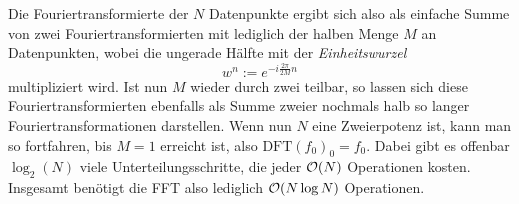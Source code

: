 Die Fouriertransformierte der $N$ Datenpunkte ergibt sich also als
einfache Summe von zwei
Fouriertransformierten mit lediglich der halben Menge $M$ an
Datenpunkten, wobei die ungerade Hälfte mit der \emph{Einheitswurzel}
\begin{equation}
  w^n := e^{-i\frac{2\pi}{2M} n}
\end{equation}
multipliziert wird.  Ist nun $M$ wieder durch zwei teilbar, so lassen
sich diese Fouriertransformierten ebenfalls als Summe zweier nochmals
halb so langer Fouriertransformationen darstellen. Wenn nun $N$ eine
Zweierpotenz ist, kann man so fortfahren, bis $M=1$ erreicht ist, also
$\text{DFT}(f_0)_0 = f_0$. Dabei gibt es offenbar $\log_2(N)$ viele
Unterteilungsschritte, die jeder $\mathcal O(N)$ Operationen kosten. Insgesamt
benötigt die FFT also lediglich $\mathcal O(N\log N)$ Operationen.

